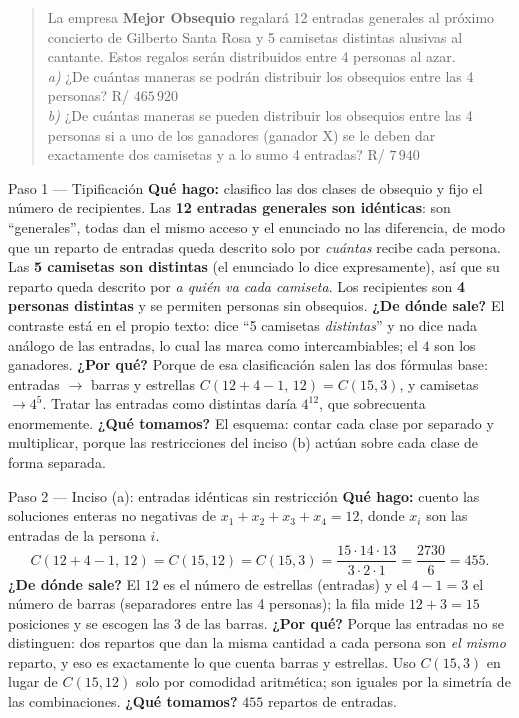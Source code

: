 \documentclass[11pt]{article}
\begin{document}
\begin{quote}
La empresa \textbf{Mejor Obsequio} regalará 12 entradas generales al próximo concierto de Gilberto Santa Rosa y 5 camisetas distintas alusivas al cantante. Estos regalos serán distribuidos entre 4 personas al azar.\\
\textit{a)} ¿De cuántas maneras se podrán distribuir los obsequios entre las 4 personas? \hfill R/ $465\,920$\\
\textit{b)} ¿De cuántas maneras se pueden distribuir los obsequios entre las 4 personas si a uno de los ganadores (ganador X) se le deben dar exactamente dos camisetas y a lo sumo 4 entradas? \hfill R/ $7\,940$
\end{quote}

\begin{paso}{Paso 1 --- Tipificación}
\textbf{Qué hago:} clasifico las dos clases de obsequio y fijo el número de recipientes.
Las \textbf{12 entradas generales son idénticas}: son ``generales'', todas dan el mismo acceso y el enunciado no las diferencia, de modo que un reparto de entradas queda descrito solo por \emph{cuántas} recibe cada persona. Las \textbf{5 camisetas son distintas} (el enunciado lo dice expresamente), así que su reparto queda descrito por \emph{a quién va cada camiseta}. Los recipientes son \textbf{4 personas distintas} y se permiten personas sin obsequios.
\textbf{¿De dónde sale?} El contraste está en el propio texto: dice ``5 camisetas \emph{distintas}'' y no dice nada análogo de las entradas, lo cual las marca como intercambiables; el $4$ son los ganadores.
\textbf{¿Por qué?} Porque de esa clasificación salen las dos fórmulas base: entradas $\to$ barras y estrellas $C(12+4-1,\,12)=C(15,3)$, y camisetas $\to 4^5$. Tratar las entradas como distintas daría $4^{12}$, que sobrecuenta enormemente.
\textbf{¿Qué tomamos?} El esquema: contar cada clase por separado y multiplicar, porque las restricciones del inciso (b) actúan sobre cada clase de forma separada.
\end{paso}

\begin{paso}{Paso 2 --- Inciso (a): entradas idénticas sin restricción}
\textbf{Qué hago:} cuento las soluciones enteras no negativas de $x_1+x_2+x_3+x_4=12$, donde $x_i$ son las entradas de la persona $i$.
\[
C(12+4-1,\,12)=C(15,12)=C(15,3)=\frac{15\cdot14\cdot13}{3\cdot2\cdot1}=\frac{2730}{6}=455 .
\]
\textbf{¿De dónde sale?} El $12$ es el número de estrellas (entradas) y el $4-1=3$ el número de barras (separadores entre las 4 personas); la fila mide $12+3=15$ posiciones y se escogen las $3$ de las barras.
\textbf{¿Por qué?} Porque las entradas no se distinguen: dos repartos que dan la misma cantidad a cada persona son \emph{el mismo} reparto, y eso es exactamente lo que cuenta barras y estrellas. Uso $C(15,3)$ en lugar de $C(15,12)$ solo por comodidad aritmética; son iguales por la simetría de las combinaciones.
\textbf{¿Qué tomamos?} $455$ repartos de entradas.
\end{paso}
\end{document}
